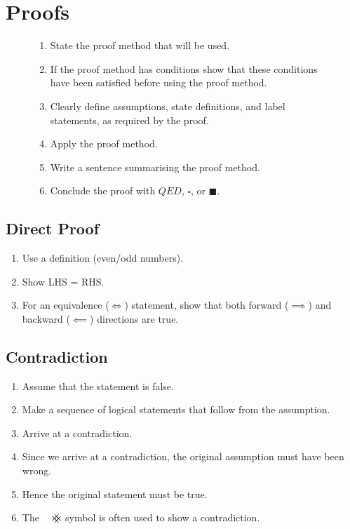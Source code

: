 \documentclass{article}
\newcommand{\contradiction}{
	{\hbox{
	\setbox0=\hbox{$\mkern-3mu{\times}\mkern-3mu$}
	\setbox1=\hbox to0pt{\hss\copy0\hss}
	\copy0\raisebox{0.5\wd0}{\copy1}\raisebox{-0.5\wd0}{\box1}\box0}}
}
\theoremstyle{plain}
\numberwithin{theorem}{subsection}
\theoremstyle{definition}
\numberwithin{definition}{subsection}
\theoremstyle{remark}
\numberwithin{note}{section}
\begin{document}
\section{Proofs}
\begin{figure}[H]
	\begin{mdframed}[style=exampledefault,frametitle={Proof Structure}]
		\begin{enumerate}[leftmargin=3.5em, itemsep=0.2em, topsep=0.35em]
			\item State the proof method that will be used.
			\item If the proof method has conditions show that these conditions have been satisfied before using the proof method.
			\item Clearly define assumptions, state definitions, and label statements, as required by the proof.
			\item Apply the proof method.
			\item Write a sentence summarising the proof method.
			\item Conclude the proof with $QED$, $\square$, or $\blacksquare$.
		\end{enumerate}
	\end{mdframed}
\end{figure}
%
\subsection{Direct Proof}
\begin{enumerate}
    \item Use a definition (even/odd numbers).
    \item Show LHS = RHS.
    \item For an equivalence ($\iff$) statement, show that both forward ($\implies$) and backward ($\impliedby$) directions are true.
\end{enumerate}
%
\subsection{Contradiction}
\begin{enumerate}
    \item Assume that the statement is false.
    \item Make a sequence of logical statements that follow from the assumption.
    \item Arrive at a contradiction.
    \item Since we arrive at a contradiction, the original assumption must have been wrong.
    \item Hence the original statement must be true.
	\item The $\contradiction$ symbol is often used to show a contradiction.
\end{enumerate}
%
\end{document}
